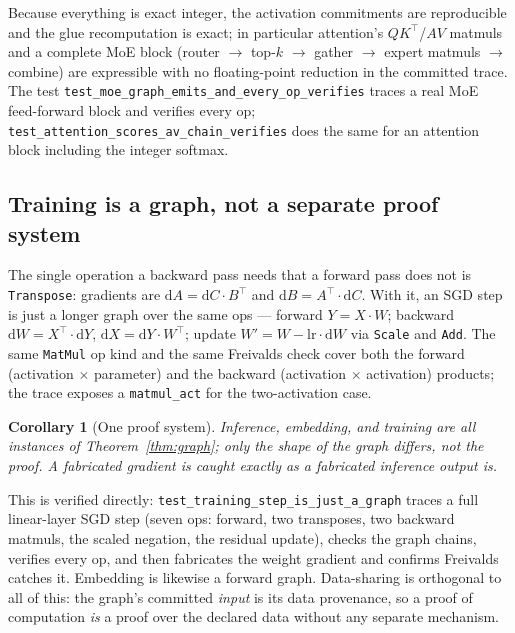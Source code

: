 \documentclass[11pt,a4paper]{article}
\newtheorem{corollary}{Corollary}
\begin{document}
Because everything is exact integer, the activation commitments are reproducible and the glue recomputation is exact; in particular attention's $QK^{\top}$/$AV$ matmuls and a complete MoE block (router $\to$ top-$k$ $\to$ gather $\to$ expert matmuls $\to$ combine) are expressible with no floating-point reduction in the committed trace. The test \texttt{test\_moe\_graph\_emits\_and\_every\_op\_verifies} traces a real MoE feed-forward block and verifies every op; \texttt{test\_attention\_scores\_av\_chain\_verifies} does the same for an attention block including the integer softmax.

\subsection{Training is a graph, not a separate proof system}\label{sec:training}

The single operation a backward pass needs that a forward pass does not is \texttt{Transpose}: gradients are $\mathrm{d}A = \mathrm{d}C \cdot B^{\top}$ and $\mathrm{d}B = A^{\top} \cdot \mathrm{d}C$. With it, an SGD step is just a longer graph over the same ops --- forward $Y = X\cdot W$; backward $\mathrm{d}W = X^{\top}\!\cdot \mathrm{d}Y$, $\mathrm{d}X = \mathrm{d}Y \cdot W^{\top}$; update $W' = W - \text{lr}\cdot \mathrm{d}W$ via \texttt{Scale} and \texttt{Add}. The same \texttt{MatMul} op kind and the same Freivalds check cover both the forward (activation $\times$ parameter) and the backward (activation $\times$ activation) products; the trace exposes a \texttt{matmul\_act} for the two-activation case.

\begin{corollary}[One proof system]\label{cor:one-system}
Inference, embedding, and training are all instances of Theorem~\ref{thm:graph}; only the shape of the graph differs, not the proof. A fabricated gradient is caught exactly as a fabricated inference output is.
\end{corollary}

This is verified directly: \texttt{test\_training\_step\_is\_just\_a\_graph} traces a full linear-layer SGD step (seven ops: forward, two transposes, two backward matmuls, the scaled negation, the residual update), checks the graph chains, verifies every op, and then fabricates the weight gradient and confirms Freivalds catches it. Embedding is likewise a forward graph. Data-sharing is orthogonal to all of this: the graph's committed \emph{input} is its data provenance, so a proof of computation \emph{is} a proof over the declared data without any separate mechanism.
\end{document}
